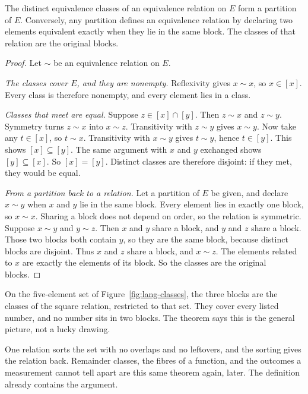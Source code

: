 \begin{theorem}\label{thm:lang-partition}
The distinct equivalence classes of an equivalence relation on $E$ form a partition of $E$. Conversely, any partition defines an equivalence relation by declaring two elements equivalent exactly when they lie in the same block. The classes of that relation are the original blocks.
\end{theorem}
\begin{proof}
Let $\sim$ be an equivalence relation on $E$.

\emph{The classes cover $E$, and they are nonempty.} Reflexivity gives $x\sim x$, so $x\in[x]$. Every class is therefore nonempty, and every element lies in a class.

\emph{Classes that meet are equal.} Suppose $z\in[x]\cap[y]$. Then $z\sim x$ and $z\sim y$. Symmetry turns $z\sim x$ into $x\sim z$. Transitivity with $z\sim y$ gives $x\sim y$. Now take any $t\in[x]$, so $t\sim x$. Transitivity with $x\sim y$ gives $t\sim y$, hence $t\in[y]$. This shows $[x]\subseteq[y]$. The same argument with $x$ and $y$ exchanged shows $[y]\subseteq[x]$. So $[x]=[y]$. Distinct classes are therefore disjoint: if they met, they would be equal.

\emph{From a partition back to a relation.} Let a partition of $E$ be given, and declare $x\sim y$ when $x$ and $y$ lie in the same block. Every element lies in exactly one block, so $x\sim x$. Sharing a block does not depend on order, so the relation is symmetric. Suppose $x\sim y$ and $y\sim z$. Then $x$ and $y$ share a block, and $y$ and $z$ share a block. Those two blocks both contain $y$, so they are the same block, because distinct blocks are disjoint. Thus $x$ and $z$ share a block, and $x\sim z$. The elements related to $x$ are exactly the elements of its block. So the classes are the original blocks.
\end{proof}

On the five-element set of Figure~\ref{fig:lang-classes}, the three blocks are the classes of the square relation, restricted to that set. They cover every listed number, and no number sits in two blocks. The theorem says this is the general picture, not a lucky drawing.

\begin{beauty}
One relation sorts the set with no overlaps and no leftovers, and the sorting gives the relation back. Remainder classes, the fibres of a function, and the outcomes a measurement cannot tell apart are this same theorem again, later. The definition already contains the argument.
\end{beauty}

